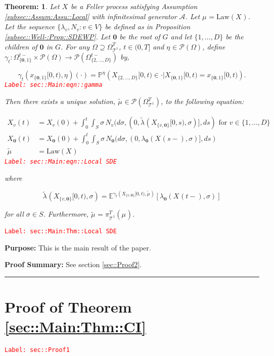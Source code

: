 \documentclass[12pt]{article}
\newcommand{\mb}{\mathbb}
\newcommand{\mc}{\mathcal}
\newcommand{\ra}{\rightarrow}
\newcommand{\te}{\text}
\newcommand{\tr}{\textcolor{red}}
\newcommand{\labe}[1]{\tr{\texttt{Label: #1}}}
\newcommand{\purpose}{\textbf{Purpose: }}
\newcommand{\pfsum}{\textbf{Proof Summary: }}
\newcommand{\lin}{\rule{\linewidth}{0.4 pt}}
\newcommand{\pr}{\mb{P}}							%
\newcommand{\exmu}[2]{\mb{E}^{#1}\left[#2\right]}	%
\newcommand{\pmsr}{\mc{P}}							%
\renewcommand{\root}{\mathbf{0}}				%
\renewcommand{\v}{v}							%
\renewcommand{\S}{S}							%
\newcommand{\s}{\sigma}							%
\newcommand{\T}{T}								%
\newcommand{\OmegaV}[2]{\Omega_{#1}^{#2}}		%
\renewcommand{\t}{t}							%
\newcommand{\degr}{D}								%
\newcommand{\poiss}[1]{N_{#1}}						%
\newcommand{\IG}{\mc{A}}						%
\newcommand{\law}{\te{Law}}							%
\newcommand{\pup}[1]{^{#1}}							%
\newcommand{\tree}{\mc{T}}							%
\renewcommand{\G}{G}								%
\newcommand{\V}{V}									%
\renewcommand{\tt}{s}								%
\newcommand{\piV}[2]{\pi_{#1}^{#2}}					%
\newcommand{\rxvt}[2]{X_{#1}{(#2)}}					%
\newcommand{\xvts}[2]{x_{#1}{#2}}					%
\newcommand{\rxvts}[2]{X_{#1}{#2}}					%
\newcommand{\m}[3]{\mu_{#2#1}^{#3}}						%
\newcommand{\mmm}[3]{\eta_{#2#1}^{#3}}						%
\newcommand{\cm}{\gamma}							%
\newcommand{\rate}[1]{\lambda_{#1}}					%
\newcommand{\alt}{\widetilde}						%
\newtheorem{thms}{Theorem: }[section]
\begin{document}
\begin{thms}
Let \(\rxvts{}{}\) be a Feller process satisfying Assumption \ref{subsec::Assum:Assu::Local} with infinitesimal generator \(\IG\). Let \(\m{}{}{} = \law(\rxvts{}{})\). Let the sequence \(\{\rate{\v},\poiss{\v}:\v\in \V\}\) be defined as in Proposition \ref{subsec::Well-:Prop::SDEWP}. Let \(\root\) be the root of \(\G\) and let \(\{1,\dots,\degr\}\) be the children of \(\root\) in \(\G\). For any \(\Omega \supseteq\OmegaV{\tree\pup{1}}{\T}\), \(\t\in (0,\T]\) and \(\mmm{}{}{} \in \pmsr(\Omega)\), define \(\cm_\t:\OmegaV{\{\root,1\}}{\t-}\times \pmsr(\Omega) \ra \pmsr(\OmegaV{\{2,\dots,\degr\}}{\t-})\) by,

\begin{equation}
\cm_\t(\xvts{\{\root,1\}}{[0,\t)},\mmm{}{}{})(\cdot) = \pr^{\mmm{}{}{}}\left(\rxvts{\{2,\dots,\degr\}}{[0,\t)} \in \cdot|\rxvts{\{\root,1\}}{[0,\t)} = \xvts{\{\root,1\}}{[0,\t)}\right).
\label{sec::Main:eqn::gamma}
\end{equation}
\labe{sec::Main:eqn::gamma}

Then there exists a unique solution, \(\alt{\m{}{}{}} \in \pmsr(\OmegaV{\tree\pup{1}}{\T})\), to the following equation:

\begin{align}
\rxvt{\v}{\t} &= \rxvt{\v}{0} + \int_0^\t\int_\S \s\,\poiss{\v}(d\s,(0,\alt{\rate{}}(\rxvts{\{\v,\root\}}{[0,\tt)},\s)],d\tt) \te{ for } \v \in \{1,\dots,\degr\}\nonumber\\
\rxvt{\root}{\t} &= \rxvt{\root}{0} + \int_0^\t\int_\S \s\,\poiss{\root}(d\s,(0,\rate{\root}(\rxvt{}{\tt-},\s)],d\tt)\nonumber\\
\alt{\m{}{}{}} &= \law(\rxvts{}{})
\label{sec::Main:eqn::Local SDE}
\end{align}
\labe{sec::Main:eqn::Local SDE}

where

\[\alt{\rate{}}(\rxvts{\{\v,\root\}}{[0,\t)},\s) = \exmu{\cm_t(\rxvts{\{\v,\root\}}{[0,\t)},\alt{\m{}{}{}})}{\rate{\root}(\rxvt{}{\t-},\s)}\]

for all \(\s\in \S\). Furthermore, \(\alt{\m{}{}{}} = \piV{\tree\pup{1}}{\T}(\m{}{}{})\).
\label{sec::Main:Thm::Local SDE}
\end{thms}
\labe{sec::Main:Thm::Local SDE}

\purpose This is the main result of the paper. 

\pfsum See section \ref{sec::Proof2}.

\lin

\section{Proof of Theorem \ref{sec::Main:Thm::CI}}
\label{sec::Proof1}\labe{sec::Proof1}
\end{document}
